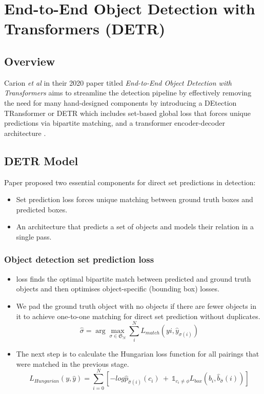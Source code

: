 \section{End-to-End Object Detection with Transformers (DETR)}

\label{appendix:detr-paper}

\subsection{Overview}

\par Carion \textit{et al} in their 2020 paper titled \textit{End-to-End Object Detection with Transformers} aims to streamline the detection pipeline by effectively removing the need for many hand-designed components by introducing a DEtection TRansformer or DETR which includes set-based global loss that forces unique predictions via bipartite matching, and a transformer encoder-decoder architecture \cite{carion2020detr}.

\subsection{DETR Model}
\par Paper proposed two essential components for direct set predictions in detection: \par
\begin{itemize}
	\item Set prediction loss forces unique matching between ground truth boxes and predicted boxes.
	\item An architecture that predicts a set of objects and models their relation in a single pass.
\end{itemize}

\subsubsection{Object detection set prediction loss}
\begin{itemize}
	\item loss finds the optimal bipartite match between predicted and ground truth objects and then optimises object-specific (bounding box) losses. 
	\item We pad the ground truth object with no objects if there are fewer objects in it to achieve one-to-one matching for direct set prediction without duplicates.
	$$\hat{\sigma} = \arg \max_{\sigma \in \mathfrak{S}_N} \displaystyle\sum\limits_{i}^N L_{match}(yi, \hat{y}_{\sigma(i)})$$
	
	\item The next step is to calculate the Hungarian loss function for all pairings that were matched in the previous stage.
	$$L_{Hungarian}(y, \hat{y}) = \displaystyle\sum\limits_{i=0}^N [-log\hat{p}_{\hat{\sigma} (i)}(c_i)\:+\:\mathbb{1}_{c_i\neq\phi}L_{box}(b_i, \hat{b}_{\hat{\sigma}}(i))]$$
\end{itemize}

